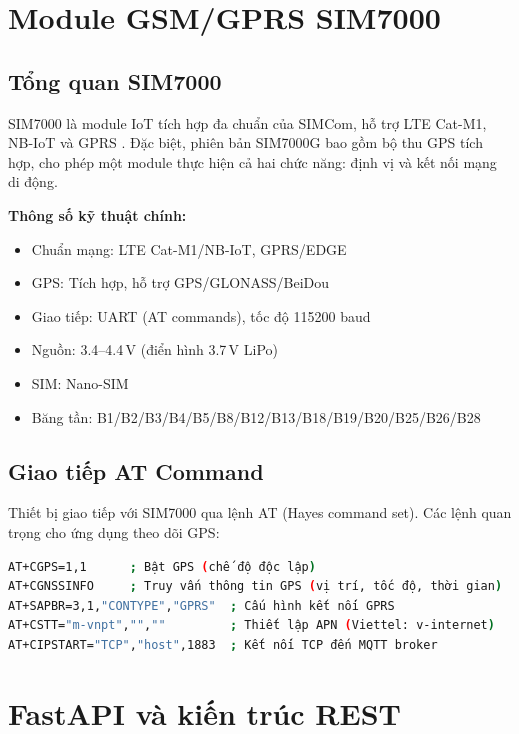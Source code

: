 \section{Module GSM/GPRS SIM7000}

\subsection{Tổng quan SIM7000}

SIM7000 là module IoT tích hợp đa chuẩn của SIMCom, hỗ trợ LTE Cat-M1, NB-IoT và GPRS \cite{simcom2023sim7000}. Đặc biệt, phiên bản SIM7000G bao gồm bộ thu GPS tích hợp, cho phép một module thực hiện cả hai chức năng: định vị và kết nối mạng di động.

\textbf{Thông số kỹ thuật chính:}
\begin{itemize}[noitemsep]
  \item Chuẩn mạng: LTE Cat-M1/NB-IoT, GPRS/EDGE
  \item GPS: Tích hợp, hỗ trợ GPS/GLONASS/BeiDou
  \item Giao tiếp: UART (AT commands), tốc độ 115200 baud
  \item Nguồn: 3.4--4.4\,V (điển hình 3.7\,V LiPo)
  \item SIM: Nano-SIM
  \item Băng tần: B1/B2/B3/B4/B5/B8/B12/B13/B18/B19/B20/B25/B26/B28
\end{itemize}

\subsection{Giao tiếp AT Command}

Thiết bị giao tiếp với SIM7000 qua lệnh AT (Hayes command set). Các lệnh quan trọng cho ứng dụng theo dõi GPS:

\begin{lstlisting}[language=bash, caption=Các lệnh AT cơ bản cho SIM7000]
AT+CGPS=1,1      ; Bật GPS (chế độ độc lập)
AT+CGNSSINFO     ; Truy vấn thông tin GPS (vị trí, tốc độ, thời gian)
AT+SAPBR=3,1,"CONTYPE","GPRS"  ; Cấu hình kết nối GPRS
AT+CSTT="m-vnpt","",""         ; Thiết lập APN (Viettel: v-internet)
AT+CIPSTART="TCP","host",1883  ; Kết nối TCP đến MQTT broker
\end{lstlisting}

\section{FastAPI và kiến trúc REST}

